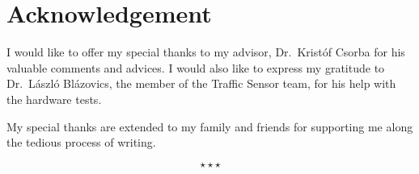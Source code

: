 \chapter*{Acknowledgement}

I would like to offer my special thanks to my advisor, Dr.~Krist{\'o}f Csorba for his valuable comments and advices.
I would also like to express my gratitude to Dr.~L{\'a}szl{\'o} Bl{\'a}zovics, the member of the Traffic Sensor team, for his help with the hardware tests.

My special thanks are extended to my family and friends for supporting me along the tedious process of writing.


\begin{displaymath}
	\star \star \star
\end{displaymath}